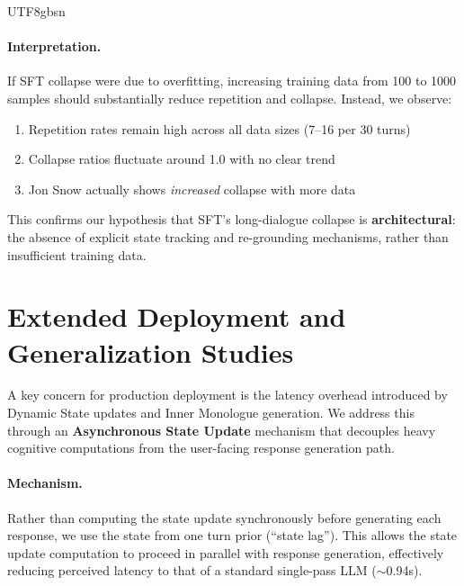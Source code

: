 \documentclass[11pt]{article}
\begin{document}
\begin{CJK*}{UTF8}{gbsn}
\paragraph{Interpretation.} If SFT collapse were due to overfitting, increasing training data from 100 to 1000 samples should substantially reduce repetition and collapse. Instead, we observe:
\begin{enumerate}
    \item Repetition rates remain high across all data sizes (7--16 per 30 turns)
    \item Collapse ratios fluctuate around 1.0 with no clear trend
    \item Jon Snow actually shows \textit{increased} collapse with more data
\end{enumerate}
This confirms our hypothesis that SFT's long-dialogue collapse is \textbf{architectural}: the absence of explicit state tracking and re-grounding mechanisms, rather than insufficient training data.

\section{Extended Deployment and Generalization Studies}
\label{sec:async_state}

A key concern for production deployment is the latency overhead introduced by Dynamic State updates and Inner Monologue generation. We address this through an \textbf{Asynchronous State Update} mechanism that decouples heavy cognitive computations from the user-facing response generation path.

\paragraph{Mechanism.} Rather than computing the state update synchronously before generating each response, we use the state from one turn prior (``state lag''). This allows the state update computation to proceed in parallel with response generation, effectively reducing perceived latency to that of a standard single-pass LLM ($\sim$0.94s).


\end{CJK*}
\end{document}
